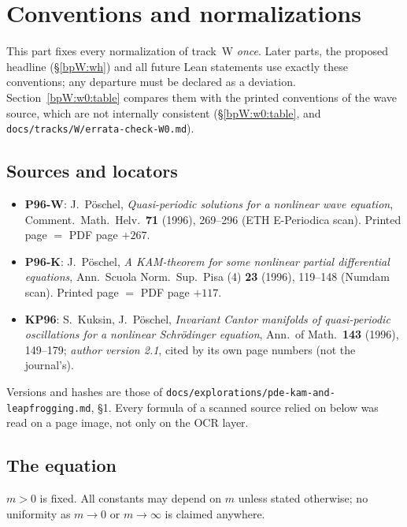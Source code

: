 \section{Conventions and normalizations}\label{bpW:w0}

This part fixes every normalization of track~W \emph{once}. Later parts, the proposed headline
(\S\ref{bpW:wh}) and all future Lean statements use exactly these conventions; any departure must be declared as a
deviation. Section~\ref{bpW:w0:table} compares them with the printed conventions of the wave source, which are not
internally consistent (\S\ref{bpW:w0:table}, and \texttt{docs/tracks/W/errata-check-W0.md}).

\subsection{Sources and locators}\label{bpW:w0:sources}

\begin{itemize}
\item \textbf{P96-W}: J.~P\"oschel, \emph{Quasi-periodic solutions for a nonlinear wave equation}, Comment.\ Math.\
  Helv.\ \textbf{71} (1996), 269--296 (ETH E-Periodica scan). Printed page $=$ PDF page $+267$.
\item \textbf{P96-K}: J.~P\"oschel, \emph{A KAM-theorem for some nonlinear partial differential equations}, Ann.\
  Scuola Norm.\ Sup.\ Pisa (4) \textbf{23} (1996), 119--148 (Numdam scan). Printed page $=$ PDF page $+117$.
\item \textbf{KP96}: S.~Kuksin, J.~P\"oschel, \emph{Invariant Cantor manifolds of quasi-periodic oscillations for a
  nonlinear Schr\"odinger equation}, Ann.\ of Math.\ \textbf{143} (1996), 149--179; \emph{author version 2.1}, cited
  by its own page numbers (not the journal's).
\end{itemize}
Versions and hashes are those of \texttt{docs/explorations/pde-kam-and-leapfrogging.md}, \S1. Every formula of a
scanned source relied on below was read on a page image, not only on the OCR layer.

\subsection{The equation}\label{bpW:w0:pde}

\begin{assumption}[Mass]\label{bpW:w0:mass}
$m>0$ is fixed. All constants may depend on $m$ unless stated otherwise; no uniformity as $m\to0$ or $m\to\infty$ is
claimed anywhere.
\end{assumption}


